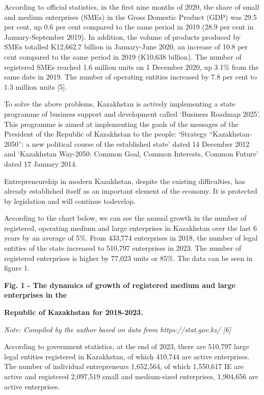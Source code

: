 According to official statistics, in the first nine months of 2020, the
share of small and medium enterprises (SMEs) in the Gross Domestic
Product (GDP) was 29.5 per cent, up 0.6 per cent compared to the same
period in 2019 (28.9 per cent in January-September 2019). In addition,
the volume of products produced by SMEs totalled K12,662.7 billion in
January-June 2020, an increase of 10.8 per cent compared to the same
period in 2019 (K10,638 billion). The number of registered SMEs reached
1.6 million units on 1 December 2020, up 3.1\% from the same date in
2019. The number of operating entities increased by 7.8 per cent to 1.3
million units {[}5{]}.

To solve the above problems, Kazakhstan is actively implementing a state
programme of business support and development called `Business Roadmap
2025'. This programme is aimed at implementing the goals of the messages
of the President of the Republic of Kazakhstan to the people: `Strategy
``Kazakhstan-2050'': a new political course of the established state'
dated 14 December 2012 and `Kazakhstan Way-2050: Common Goal, Common
Interests, Common Future' dated 17 January 2014.

Entrepreneurship in modern Kazakhstan, despite the existing
difficulties, has already established itself as an important element of
the economy. It is protected by legislation and will continue todevelop.

According to the chart below, we can see the annual growth in the number
of registered, operating medium and large enterprises in Kazakhstan over
the last 6 years by an average of 5\%. From 433,774 enterprises in 2018,
the number of legal entities of the state increased to 510,797
enterprises in 2023. The number of registered enterprises is higher by
77,023 units or 85\%. The data can be seen in figure 1.

{\bfseries Fig. 1 - The dynamics of growth of registered medium and large
enterprises in the}

{\bfseries Republic of Kazakhstan for 2018-2023.}

\emph{Note: Compiled by the author based on data from
https://stat.gov.kz/ {[}6{]}}

According to government statistics, at the end of 2023, there are
510,797 large legal entities registered in Kazakhstan, of which 410,744
are active enterprises. The number of individual entrepreneurs
1,652,564, of which 1,550,617 IE are active and registered 2,097,519
small and medium-sized enterprises, 1,904,656 are active enterprises.

